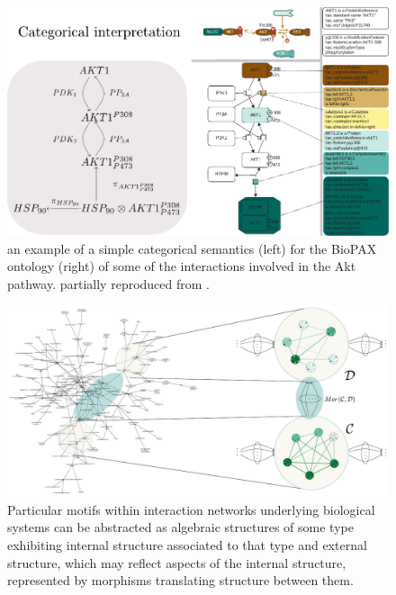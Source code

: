 \begin{frame}
\begin{figure}
\noindent\includegraphics[width=0.8\framewidth]{fig/biopax.pdf}
\caption{an example of a simple categorical semantics (left) for the BioPAX ontology \cite{Demir2010} (right) of some of the interactions involved in the Akt pathway. partially reproduced from \cite{Demir2010}.}
\label{fig:biopax}
\end{figure}
\end{frame}

\begin{frame}
\begin{figure}
\noindent\includegraphics[width=0.8\framewidth]{fig/biograph.pdf}
\caption{Particular motifs within interaction networks underlying biological systems can be abstracted as algebraic structures of some type exhibiting internal structure associated to that type and external structure, which may reflect aspects of the internal structure, represented by morphisms translating structure between them.}
\label{fig:biograph}
\end{figure}
\end{frame}

